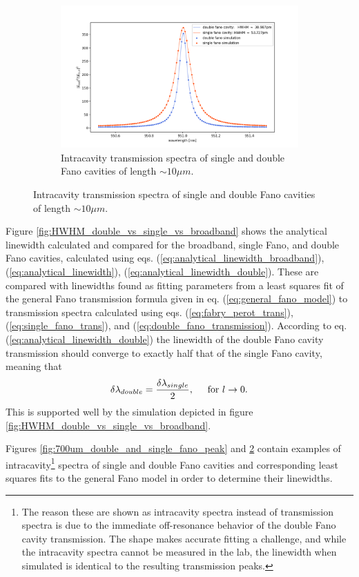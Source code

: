 \begin{figure}[h!]
\begin{subfigure}[c]{0.34\textwidth}
        \label{fig:700um_double_and_single_fano_peak}
        \includegraphics[width=\textwidth]{figures/sim_single_vs_double_10um.png}
        \caption{Intracavity transmission spectra of single and double Fano cavities of length $\sim 10 \mu m$.}
        \label{fig:10um_double_and_single_fano_peak}
    \end{subfigure}
\end{figure}

Figure \ref{fig:HWHM_double_vs_single_vs_broadband} shows the analytical linewidth calculated and compared for the broadband, single Fano, and double Fano cavities, calculated using eqs. (\ref{eq:analytical_linewidth_broadband}), (\ref{eq:analytical_linewidth}), (\ref{eq:analytical_linewidth_double}). These are compared with linewidths found as fitting parameters from a least squares fit of the general Fano transmission formula given in eq. (\ref{eq:general_fano_model}) to transmission spectra calculated using eqs. (\ref{eq:fabry_perot_trans}), (\ref{eq:single_fano_trans}), and (\ref{eq:double_fano_transmission}). According to eq. (\ref{eq:analytical_linewidth_double}) the linewidth of the double Fano cavity transmission should converge to exactly half that of the single Fano cavity, meaning that
\begin{equation}
    \delta \lambda_{double} = \frac{\delta \lambda_{single}}{2}, \hspace{0.5cm} \text{for } l \rightarrow 0.
\end{equation}
This is supported well by the simulation depicted in figure \ref{fig:HWHM_double_vs_single_vs_broadband}.

Figures \ref{fig:700um_double_and_single_fano_peak} and \ref{fig:10um_double_and_single_fano_peak} contain examples of intracavity\footnote{The reason these are shown as intracavity spectra instead of transmission spectra is due to the immediate off-resonance behavior of the double Fano cavity transmission. The shape makes accurate fitting a challenge, and while the intracavity spectra cannot be measured in the lab, the linewidth when simulated is identical to the resulting transmission peaks.} spectra of single and double Fano cavities and corresponding least squares fits to the general Fano model in order to determine their linewidths. 

